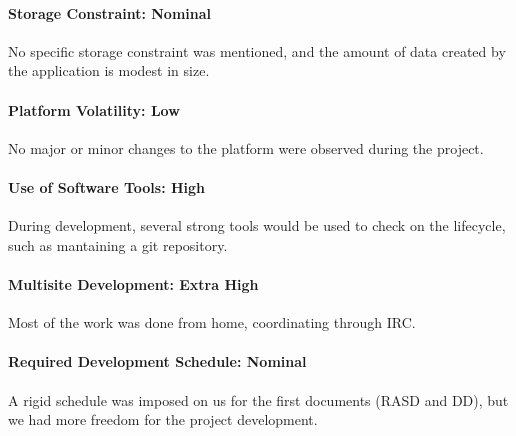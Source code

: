 \paragraph*{Storage Constraint: Nominal}
No specific storage constraint was mentioned, and the amount of data created by the application is modest in size.

\paragraph*{Platform Volatility: Low}
No major or minor changes to the platform were observed during the project.

\paragraph*{Use of Software Tools: High}
During development, several strong tools would be used to check on the lifecycle, such as mantaining a git repository.

\paragraph*{Multisite Development: Extra High}
Most of the work was done from home, coordinating through IRC.

\paragraph*{Required Development Schedule: Nominal}
A rigid schedule was imposed on us for the first documents (RASD and DD), but we had more freedom for the project development.

